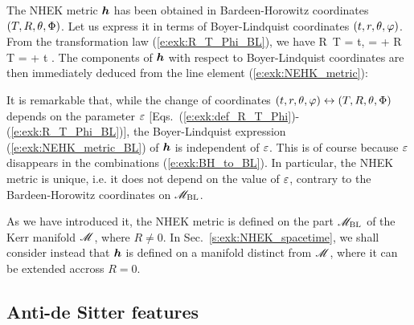 The NHEK metric $\bm{h}$ has been obtained in Bardeen-Horowitz coordinates
$(T,R,\theta,\Phi)$. Let us express it in terms of Boyer-Lindquist coordinates
$(t,r,\theta,\varphi)$. From the transformation law (\ref{e:exk:R_T_Phi_BL}), we have
\be \label{e:exk:BH_to_BL}
    R \,\D T =  \D t,\qquad
     =  \qand
    \D\Phi + R \, \D T = \D\ph +  \D t .
\ee
The components of $\bm{h}$ with respect to Boyer-Lindquist coordinates are then
immediately deduced from the line element (\ref{e:exk:NEHK_metric}):
\be \label{e:exk:NEHK_metric_BL}
\ee
\begin{remark}
It is remarkable that, while
the change of coordinates $(t,r,\theta,\varphi)\leftrightarrow (T,R,\theta,\Phi)$ depends on the
parameter $\varepsilon$ [Eqs.~(\ref{e:exk:def_R_T_Phi})-(\ref{e:exk:R_T_Phi_BL})],
the Boyer-Lindquist expression (\ref{e:exk:NEHK_metric_BL}) of $\bm{h}$ is
independent of $\varepsilon$. This is of course because $\varepsilon$ disappears in
the combinations (\ref{e:exk:BH_to_BL}).
In particular, the NHEK metric is unique, i.e. it does not depend on the value
of $\varepsilon$, contrary to the Bardeen-Horowitz coordinates on
$\mathscr{M}_{\rm BL}$.
\end{remark}

\begin{remark}
As we have introduced it, the NHEK metric is defined on the part $\mathscr{M}_{\rm BL}$
of the Kerr manifold $\mathscr{M}$, where $R\neq 0$.
In Sec.~\ref{s:exk:NHEK_spacetime},
we shall consider instead that $\bm{h}$ is defined
on a manifold distinct from $\mathscr{M}$, where it can be extended accross $R=0$.
\end{remark}

\subsection{Anti-de Sitter features}

